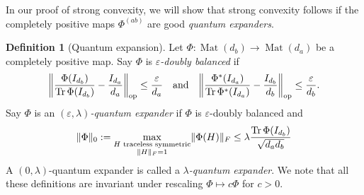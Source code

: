 \documentclass[aos]{imsart}
\theoremstyle{definition}
\newtheorem*{definition}{Definition}
\numberwithin{equation}{section}
\DeclareMathOperator{\op}{op}
\DeclareMathOperator{\Mat}{Mat}
\DeclareMathOperator{\tr}{Tr}
\DeclareMathOperator{\vect}{vec}
\DeclarePairedDelimiter{\norm}{\lVert}{\rVert}
\newcommand{\ot}{\otimes}
\newcommand{\eps}{\varepsilon}
\begin{document}
%
In our proof of strong convexity, we will show that strong convexity follows if the completely positive maps $\Phi^{(ab)}$ are good \emph{quantum expanders}.

\begin{definition}[Quantum expansion]
Let $\Phi\colon\Mat(d_b) \to \Mat(d_a)$ be a completely positive map.
Say $\Phi$ is \emph{$\eps$-doubly balanced} if
\begin{align}\label{eq:doubly balanced}
  \norm*{\frac{\Phi(I_{d_b})}{\tr \Phi(I_{d_b})} - \frac{I_{d_a}}{d_a}}_{\op} \leq \frac\eps{d_a}
\quad\text{and}\quad
  \norm*{\frac{\Phi^*(I_{d_a})}{\tr \Phi^*(I_{d_a})} - \frac{I_{d_b}}{d_b}}_{\op} \leq \frac\eps{d_b}.
\end{align}
Say $\Phi$ is an \emph{$(\eps, \lambda)$-quantum expander} if $\Phi$ is $\eps$-doubly balanced and
\begin{align}\label{eq:expansion}
  \norm{\Phi}_0 := \max_{\substack{H \text{ traceless symmetric} \\ \norm H_F=1}} \norm{\Phi(H)}_F
\leq \lambda \frac{\tr \Phi(I_{d_b})}{\sqrt{d_ad_b}}
\end{align}
A $(0, \lambda)$-quantum expander is called a \emph{$\lambda$-quantum expander}.
We note that all these definitions are invariant under rescaling $\Phi \mapsto c\Phi$ for $c>0$.
\end{definition}
\end{document}
